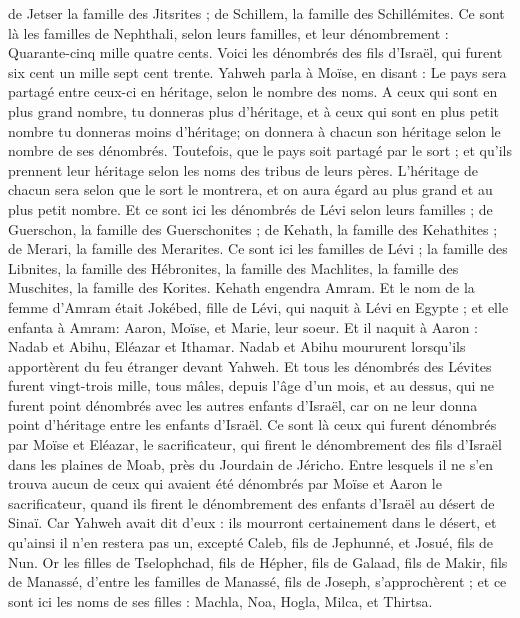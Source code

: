 \begin{multicols}{2}
de Jetser la famille des Jitsrites ; de Schillem, la famille des Schillémites.
Ce sont là les familles de Nephthali, selon leurs familles, et leur dénombrement : Quarante-cinq mille quatre cents.
Voici les dénombrés des fils d'Israël, qui furent six cent un mille sept cent trente.
Yahweh parla à Moïse, en disant :
Le pays sera partagé entre ceux-ci en héritage, selon le nombre des noms.
A ceux qui sont en plus grand nombre, tu donneras plus d'héritage, et à ceux qui sont en plus petit nombre tu donneras moins d'héritage; on donnera à chacun son héritage selon le nombre de ses dénombrés.
Toutefois, que le pays soit partagé par le sort ; et qu’ils prennent leur héritage selon les noms des tribus de leurs pères.
L’héritage de chacun sera selon que le sort le montrera, et on aura égard au plus grand et au plus petit nombre.
Et ce sont ici les dénombrés de Lévi selon leurs familles ; de Guerschon, la famille des Guerschonites ; de Kehath, la famille des Kehathites ; de Merari, la famille des Merarites.
Ce sont ici les familles de Lévi ; la famille des Libnites, la famille des Hébronites, la famille des Machlites, la famille des Muschites, la famille des Korites. Kehath engendra Amram.
Et le nom de la femme d'Amram était Jokébed, fille de Lévi, qui naquit à Lévi en Egypte ; et elle enfanta à Amram: Aaron, Moïse, et Marie, leur soeur.
Et il naquit à Aaron : Nadab et Abihu, Eléazar et Ithamar.
Nadab et Abihu moururent lorsqu'ils apportèrent du feu étranger devant Yahweh.
Et tous les dénombrés des Lévites furent vingt-trois mille, tous mâles, depuis l’âge d’un mois, et au dessus, qui ne furent point dénombrés avec les autres enfants d’Israël, car on ne leur donna point d’héritage entre les enfants d’Israël.
Ce sont là ceux qui furent dénombrés par Moïse et Eléazar, le sacrificateur, qui firent le dénombrement des fils d'Israël dans les plaines de Moab, près du Jourdain de Jéricho.
Entre lesquels il ne s’en trouva aucun de ceux qui avaient été dénombrés par Moïse et Aaron le sacrificateur, quand ils firent le dénombrement des enfants d’Israël au désert de Sinaï.
Car Yahweh avait dit d'eux : ils mourront certainement dans le désert, et qu'ainsi il n'en restera pas un, excepté Caleb, fils de Jephunné, et Josué, fils de Nun.
\VerseOne{}Or les filles de Tselophchad, fils de Hépher, fils de Galaad, fils de Makir, fils de Manassé, d'entre les familles de Manassé, fils de Joseph, s'approchèrent ;  et ce sont ici les noms de ses filles : Machla, Noa, Hogla, Milca, et Thirtsa.

\end{multicols}
